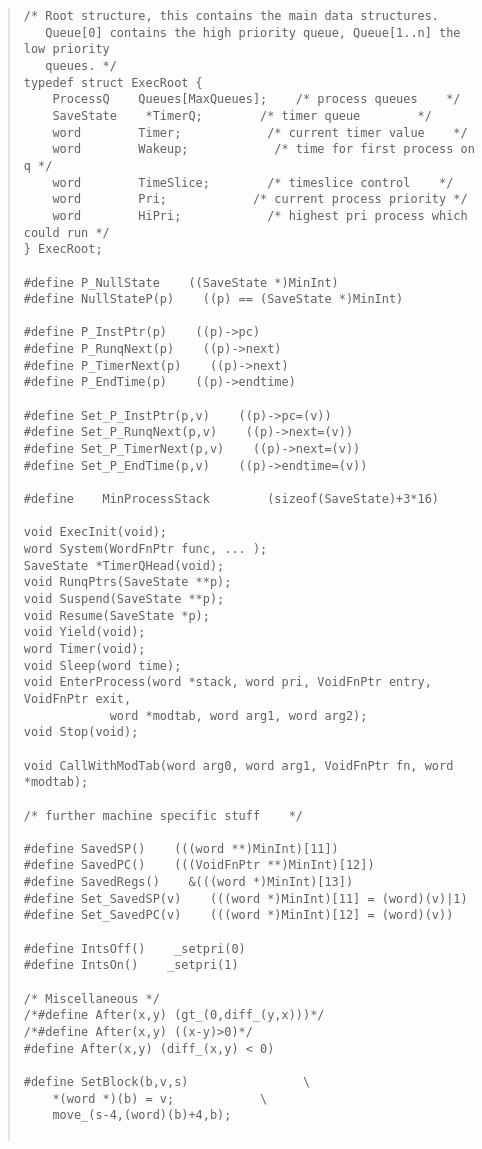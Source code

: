 \begin {quote}
\begin{verbatim}
/* Root structure, this contains the main data structures.
   Queue[0] contains the high priority queue, Queue[1..n] the low priority
   queues. */
typedef struct ExecRoot {
    ProcessQ    Queues[MaxQueues];    /* process queues    */
    SaveState    *TimerQ;        /* timer queue        */
    word        Timer;            /* current timer value    */
    word        Wakeup;            /* time for first process on q */
    word        TimeSlice;        /* timeslice control    */
    word        Pri;            /* current process priority */
    word        HiPri;            /* highest pri process which could run */
} ExecRoot;

#define P_NullState    ((SaveState *)MinInt)
#define NullStateP(p)    ((p) == (SaveState *)MinInt)

#define P_InstPtr(p)    ((p)->pc)
#define P_RunqNext(p)    ((p)->next)
#define P_TimerNext(p)    ((p)->next)
#define P_EndTime(p)    ((p)->endtime)

#define Set_P_InstPtr(p,v)    ((p)->pc=(v))
#define Set_P_RunqNext(p,v)    ((p)->next=(v))
#define Set_P_TimerNext(p,v)    ((p)->next=(v))
#define Set_P_EndTime(p,v)    ((p)->endtime=(v))

#define    MinProcessStack        (sizeof(SaveState)+3*16)

void ExecInit(void);
word System(WordFnPtr func, ... );
SaveState *TimerQHead(void);
void RunqPtrs(SaveState **p);
void Suspend(SaveState **p);
void Resume(SaveState *p);
void Yield(void);
word Timer(void);
void Sleep(word time);
void EnterProcess(word *stack, word pri, VoidFnPtr entry, VoidFnPtr exit, 
            word *modtab, word arg1, word arg2);
void Stop(void);

void CallWithModTab(word arg0, word arg1, VoidFnPtr fn, word *modtab);

/* further machine specific stuff    */

#define SavedSP()    (((word **)MinInt)[11])
#define SavedPC()    (((VoidFnPtr **)MinInt)[12])
#define SavedRegs()    &(((word *)MinInt)[13])
#define Set_SavedSP(v)    (((word *)MinInt)[11] = (word)(v)|1)
#define Set_SavedPC(v)    (((word *)MinInt)[12] = (word)(v))

#define IntsOff()    _setpri(0)
#define IntsOn()    _setpri(1)

/* Miscellaneous */
/*#define After(x,y) (gt_(0,diff_(y,x)))*/
/*#define After(x,y) ((x-y)>0)*/
#define After(x,y) (diff_(x,y) < 0)

#define SetBlock(b,v,s)                \
    *(word *)(b) = v;            \
    move_(s-4,(word)(b)+4,b);


\end{verbatim}
\end{quote}
